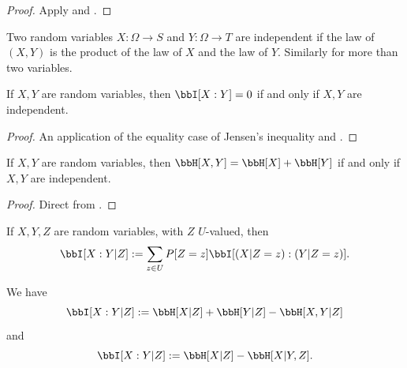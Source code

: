 \begin{proof}   \leanok Apply  and .
\end{proof}

\begin{definition}
  \label{independent-def}
  \leanok
  Two random variables $X: \Omega \to S$ and $Y: \Omega \to T$ are independent if the law of $(X,Y)$ is the product of the law of $X$ and the law of $Y$.  Similarly for more than two variables.
\end{definition}

\begin{lemma}
  \label{vanish-entropy}
  \leanok
  If $X,Y$ are random variables, then $\bbI[X:Y] = 0$ if and only if $X,Y$ are independent.
  \end{lemma}

  \begin{proof}
    \leanok

    An application of the equality case of Jensen's inequality and .
  \end{proof}

\begin{corollary}\label{add-entropy}
  \leanok
  If $X,Y$ are random variables, then $\bbH[X,Y] = \bbH[X] + \bbH[Y]$ if and only if $X,Y$ are independent.
\end{corollary}

\begin{proof} \leanok
  Direct from .
\end{proof}

\begin{definition}
\label{conditional-mutual-def}
\leanok
If $X,Y,Z$ are random variables, with $Z$ $U$-valued, then
$$ \bbI[X:Y|Z] := \sum_{z \in U} P[Z=z] \bbI[(X|Z=z): (Y|Z=z)].$$
\end{definition}

\begin{lemma}
  \label{conditional-mutual-alt}
  \leanok
We have
  $$ \bbI[X:Y|Z] := \bbH[X|Z] + \bbH[Y|Z] - \bbH[X,Y|Z]$$
and
  $$ \bbI[X:Y|Z] := \bbH[X|Z] - \bbH[X|Y,Z].$$
\end{lemma}

